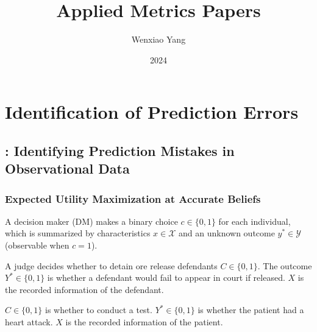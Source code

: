 \documentclass[11pt]{elegantbook}
\title{Applied Metrics Papers}
\author{Wenxiao Yang}
\institute{Haas School of Business, University of California Berkeley}
\date{2024}
\begin{document}
\maketitle

\frontmatter
\tableofcontents

\mainmatter

\chapter{Identification of Prediction Errors}
\section{\cite{rambachan2024identifying}: Identifying Prediction Mistakes in Observational Data}


\subsection{Expected Utility Maximization at Accurate Beliefs}
A decision maker (DM) makes a binary choice $c\in\{0,1\}$ for each individual, which is summarized by characteristics $x\in \mathcal{X}$ and an unknown outcome $y^*\in \mathcal{Y}$ (observable when $c=1$).

\begin{example}
    A judge decides whether to detain ore release defendants $C\in\{0,1\}$. The outcome $Y^*\in\{0,1\}$ is whether a defendant would fail to appear in court if released. $X$ is the recorded information of the defendant.
\end{example}

\begin{example}
    $C\in\{0,1\}$ is whether to conduct a test. $Y^*\in\{0,1\}$ is whether the patient had a heart attack. $X$ is the recorded information of the patient.
\end{example}
\end{document}
